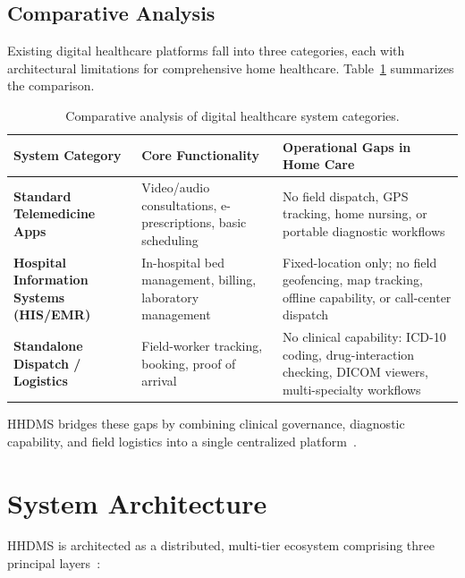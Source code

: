 \documentclass[conference]{IEEEtran}
\begin{document}
\subsection{Comparative Analysis}
Existing digital healthcare platforms fall into three categories, each with architectural limitations for comprehensive home healthcare. Table~\ref{tab:related} summarizes the comparison.

\begin{table}[htbp]
\centering
\small
\setlength{\tabcolsep}{3pt}
\renewcommand{\arraystretch}{1.2}
\begin{tabularx}{\columnwidth}{>{\raggedright\arraybackslash}p{} >{\raggedright\arraybackslash}p{} >{\raggedright\arraybackslash}X}
\toprule
\textbf{System Category} & \textbf{Core Functionality} & \textbf{Operational Gaps in Home Care} \\
\midrule
\textbf{Standard Telemedicine Apps} & Video/audio consultations, e-prescriptions, basic scheduling & No field dispatch, GPS tracking, home nursing, or portable diagnostic workflows~ \\
\textbf{Hospital Information Systems (HIS/EMR)} & In-hospital bed management, billing, laboratory management & Fixed-location only; no field geofencing, map tracking, offline capability, or call-center dispatch~\cite{pacs2001} \\
\textbf{Standalone Dispatch / Logistics} & Field-worker tracking, booking, proof of arrival & No clinical capability: ICD-10 coding, drug-interaction checking, DICOM viewers, multi-specialty workflows~\cite{who2016icd10, dicom2021} \\
\bottomrule
\end{tabularx}
\caption{Comparative analysis of digital healthcare system categories.}
\label{tab:related}
\end{table}

HHDMS bridges these gaps by combining clinical governance, diagnostic capability, and field logistics into a single centralized platform~\cite{srs2026}.

\section{System Architecture}

HHDMS is architected as a distributed, multi-tier ecosystem comprising three principal layers~\cite{fette2011websocket}:
\end{document}
